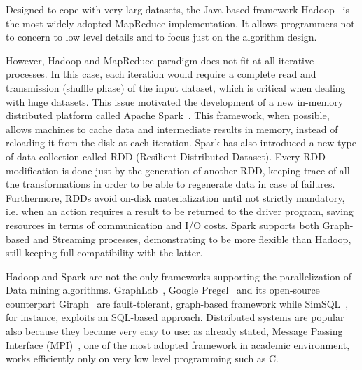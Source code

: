Designed to cope with very larg datasets, the Java based framework Hadoop~\cite{HDFS} is the most widely adopted MapReduce implementation. It allows programmers not to concern to low level details and to focus just on the algorithm design.

However, Hadoop and MapReduce paradigm does not fit at all iterative processes. In this case, each iteration would require a complete read and transmission (shuffle phase) of the input dataset, which is critical when dealing with huge datasets. This issue motivated the development of a new in-memory distributed platform called Apache Spark~\cite{Zaharia_spark}. This framework, when possible, allows machines to cache data and intermediate results in memory, instead of reloading it from the disk at each iteration. Spark has also introduced a new type of data collection called RDD (Resilient Distributed Dataset). Every RDD modification is done just by the generation of another RDD, keeping trace of all the transformations in order to be able to regenerate data in case of failures. Furthermore, RDDs avoid on-disk materialization until not strictly mandatory, i.e. when an action requires a result to be returned to the driver program, saving resources in terms of communication and I/O costs. Spark supports both Graph-based and Streaming processes, demonstrating to be more flexible than Hadoop, still keeping full compatibility with the latter.

Hadoop and Spark are
not the only frameworks supporting the parallelization of Data mining
algorithms. GraphLab~\cite{graphlab}, Google Pregel~\cite{pregel} and its
open-source counterpart Giraph~\cite{giraph} are fault-tolerant, graph-based
framework while SimSQL~\cite{simsql}, for instance, exploits an SQL-based
approach. Distributed systems are popular also because they became very easy to
use: as already stated, Message Passing Interface (MPI)~\cite{mpi}, one of the most adopted
framework in academic environment, works efficiently only on very low level
programming such as C.

